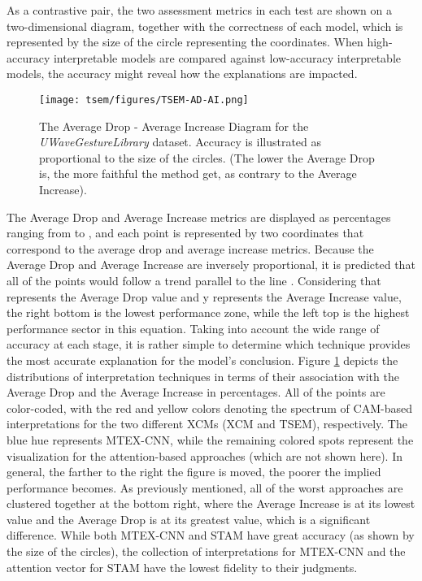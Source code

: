 \documentclass{svproc}
\begin{document}
As a contrastive pair, the two assessment metrics in each test are shown on a two-dimensional diagram, together with the correctness of each model, which is represented by the size of the circle representing the coordinates. When high-accuracy interpretable models are compared against low-accuracy interpretable models, the accuracy might reveal how the explanations are impacted.
\begin{figure}[h!]
\centering
\texttt{[image: tsem/figures/TSEM-AD-AI.png]}
\caption{The Average Drop - Average Increase Diagram for the \textit{UWaveGestureLibrary} dataset. Accuracy
is illustrated as proportional to the size of the circles. (The lower the Average Drop is, the more faithful
the method get, as contrary to the Average Increase).}
\label{fig:tsemadai}
\end{figure}
The Average Drop and Average Increase metrics are displayed as percentages ranging from  to , and each point is represented by two coordinates that correspond to the average drop and average increase metrics. Because the Average Drop and Average Increase are inversely proportional, it is predicted that all of the points would follow a trend parallel to the line . Considering that  represents the Average Drop value and y represents the Average Increase value, the right bottom is the lowest performance zone, while the left top is the highest performance sector in this equation. Taking into account the wide range of accuracy at each stage, it is rather simple to determine which technique provides the most accurate explanation for the model's conclusion. Figure \ref{fig:tsemadai} depicts the distributions of interpretation techniques in terms of their association with the Average Drop and the Average Increase in percentages. All of the points are color-coded, with the red and yellow colors denoting the spectrum of CAM-based interpretations for the two different XCMs (XCM and TSEM), respectively. The blue hue represents MTEX-CNN, while the remaining colored spots represent the visualization for the attention-based approaches (which are not shown here). In general, the farther to the right the figure is moved, the poorer the implied performance becomes. As previously mentioned, all of the worst approaches are clustered together at the bottom right, where the Average Increase is at its lowest value and the Average Drop is at its greatest value, which is a significant difference. While both MTEX-CNN and STAM have great accuracy (as shown by the size of the circles), the collection of interpretations for MTEX-CNN and the attention vector for STAM have the lowest fidelity to their judgments.
\end{document}
